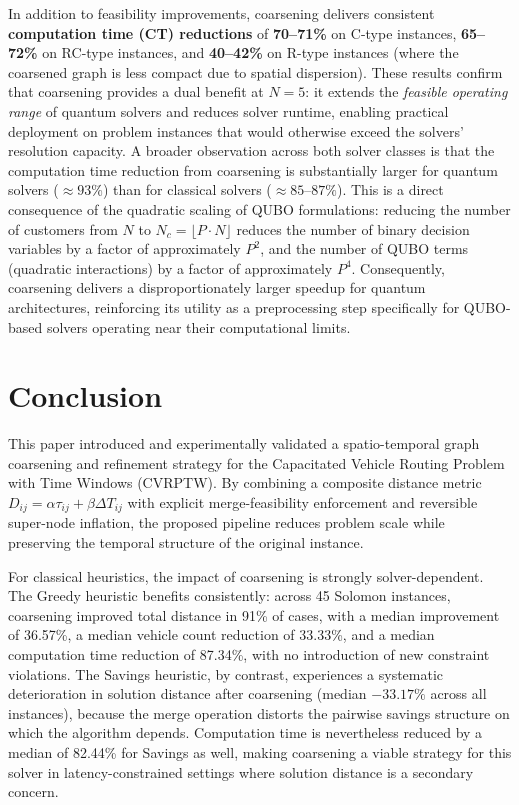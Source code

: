 \documentclass[conference]{IEEEtran}
\begin{document}
In addition to feasibility improvements, coarsening delivers consistent \textbf{computation time (CT) reductions} of \textbf{70--71\%} on C-type instances, \textbf{65--72\%} on RC-type instances, and \textbf{40--42\%} on R-type instances (where the coarsened graph is less compact due to spatial dispersion). These results confirm that coarsening provides a dual benefit at $N=5$: it extends the \emph{feasible operating range} of quantum solvers and reduces solver runtime, enabling practical deployment on problem instances that would otherwise exceed the solvers' resolution capacity.
A broader observation across both solver classes is that the computation time reduction from coarsening is substantially larger for quantum solvers ($\approx93\% $) than for classical solvers ($\approx85–87\%$). This is a direct consequence of the quadratic scaling of QUBO formulations: reducing the number of customers from $N$ to $N_c = \lfloor P \cdot N \rfloor$ reduces the number of binary decision variables by a factor of approximately $P^2$, and the number of QUBO terms (quadratic interactions) by a factor of approximately $P^4$. Consequently, coarsening delivers a disproportionately larger speedup for quantum architectures, reinforcing its utility as a preprocessing step specifically for QUBO-based solvers operating near their computational limits.
\section{Conclusion}

This paper introduced and experimentally validated a spatio-temporal graph coarsening and refinement strategy for the Capacitated Vehicle Routing Problem with Time Windows (CVRPTW). By combining a composite distance metric $D_{ij} = \alpha \tau_{ij} + \beta \Delta T_{ij}$ with explicit merge-feasibility enforcement and reversible super-node inflation, the proposed pipeline reduces problem scale while preserving the temporal structure of the original instance.

For classical heuristics, the impact of coarsening is strongly solver-dependent. The Greedy heuristic benefits consistently: across 45 Solomon instances, coarsening improved total distance in 91\% of cases, with a median improvement of 36.57\%, a median vehicle count reduction of 33.33\%, and a median computation time reduction of 87.34\%, with no introduction of new constraint violations. The Savings heuristic, by contrast, experiences a systematic deterioration in solution distance after coarsening (median $-33.17\%$ across all instances), because the merge operation distorts the pairwise savings structure on which the algorithm depends. Computation time is nevertheless reduced by a median of 82.44\% for Savings as well, making coarsening a viable strategy for this solver in latency-constrained settings where solution distance is a secondary concern.
\end{document}
